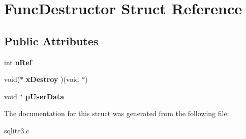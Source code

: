 \hypertarget{structFuncDestructor}{}\section{Func\+Destructor Struct Reference}
\label{structFuncDestructor}
\subsection*{Public Attributes}
\begin{DoxyCompactItemize}
\item 
int {\bfseries n\+Ref}\hypertarget{structFuncDestructor_a8b1bf3af00c88400efc1dd74a4410463}{}\label{structFuncDestructor_a8b1bf3af00c88400efc1dd74a4410463}

\item 
void($\ast$ {\bfseries x\+Destroy} )(void $\ast$)\hypertarget{structFuncDestructor_a53c33a1ad567b79570c783a8a65d6246}{}\label{structFuncDestructor_a53c33a1ad567b79570c783a8a65d6246}

\item 
void $\ast$ {\bfseries p\+User\+Data}\hypertarget{structFuncDestructor_a181875609f0f8221985cd6cfd7ad8cd8}{}\label{structFuncDestructor_a181875609f0f8221985cd6cfd7ad8cd8}

\end{DoxyCompactItemize}


The documentation for this struct was generated from the following file\+:\begin{DoxyCompactItemize}
\item 
sqlite3.\+c\end{DoxyCompactItemize}

